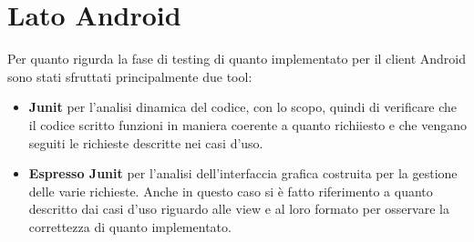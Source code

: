 \section{Lato Android}
Per quanto rigurda la fase di testing di quanto implementato per il client Android sono stati sfruttati principalmente due tool:
\begin{itemize}
	\item \textbf{Junit} per l'analisi dinamica del codice, con lo scopo, quindi di verificare che il codice scritto funzioni in maniera coerente a quanto richiiesto e che vengano seguiti le richieste descritte nei casi d'uso.
	\item \textbf{Espresso Junit} per l'analisi dell'interfaccia grafica costruita per la gestione delle varie richieste. Anche in questo caso si è fatto riferimento a quanto descritto dai casi d'uso riguardo alle view e al loro formato per osservare la correttezza di quanto implementato. 
\end{itemize}
